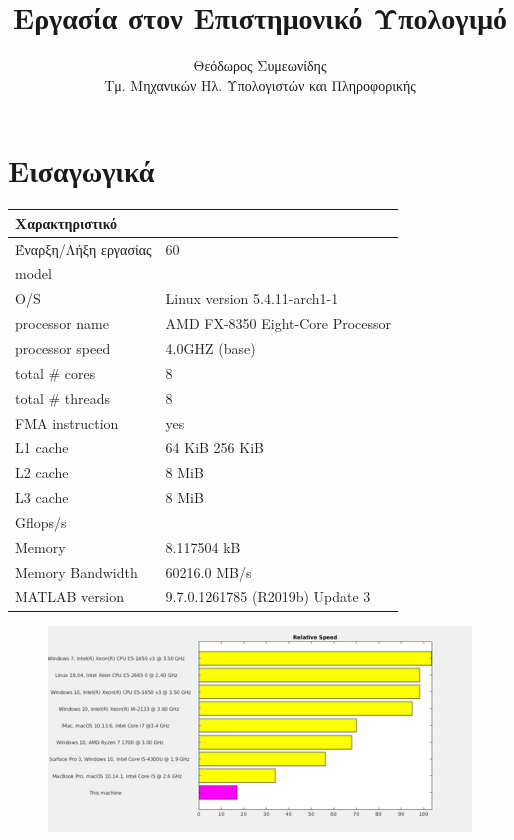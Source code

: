 \documentclass{article}
\title{Εργασία στον Επιστημονικό Υπολογιμό}
\author{Θεόδωρος Συμεωνίδης  \\
	Τμ. Μηχανικών Ηλ. Υπολογιστών και Πληροφορικής}
\begin{document}
\maketitle

\newpage

\tableofcontents

\newpage

\section{Εισαγωγικά}
\begin{tabular}{ |p{4.5cm}||p{5cm}|}
    \hline
    Χαρακτηριστικό&\\
    \hline
    Έναρξη/Λήξη εργασίας&60\\
    \hline
    model & \\
    \hline
    O/S & Linux version 5.4.11-arch1-1\\
    \hline
    processor name & AMD FX-8350 Eight-Core Processor\\
    \hline
    processor speed& 4.0GHZ (base)\\
    \hline
    total \# cores & 8\\
    \hline
    total \# threads& 8\\
    \hline
    FMA instruction & yes\\
    \hline
    L1 cache& 64 KiB 256 KiB\\
    \hline
    L2 cache& 8 MiB \\
    \hline
    L3 cache& 8 MiB\\
    \hline
    Gflops/s&\\
    \hline
    Memory & 8.117504 kB\\
    \hline
    Memory Bandwidth & 60216.0 MB/s\\
    \hline
    MATLAB version & 9.7.0.1261785 (R2019b) Update 3\\
    \hline
    \end{tabular}

\begin{figure}[h]
\includegraphics[scale=0.7]{image1}
\end{figure}
\end{document}
